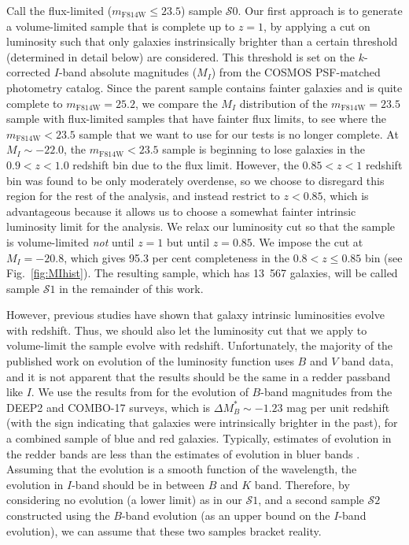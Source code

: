 \documentclass[twocolumn,useAMS,usenatbib]{mn2e}
\newcommand{\s}{\ensuremath{\mathcal{S}}}
\begin{document}
Call the flux-limited ($m_\text{F814W} \le 23.5$) sample \s$0$. Our first approach is to generate a volume-limited sample that is
complete up to $z=1$, by applying a cut on luminosity such that only
galaxies instrinsically brighter than a certain threshold (determined
in detail below) are considered. This threshold is set on the
$k$-corrected $I$-band absolute magnitudes ($M_I$) from the COSMOS PSF-matched
photometry catalog.   
Since the parent sample contains fainter galaxies and is quite
complete to $m_\text{F814W}=25.2$,
we compare the $M_I$ distribution
of the $m_\text{F814W}=23.5$ sample with flux-limited samples that
have fainter flux limits, to see where the $m_\text{F814W}<23.5$
sample that we want to use for our tests is no longer complete.
At $M_I\sim-22.0$, the
$m_\text{F814W}<23.5$ sample is beginning to lose galaxies in the
$0.9<z<1.0$ redshift bin due to the flux limit. However, the $0.85<z<1$
redshift bin was found to be only moderately overdense, so we choose
to disregard this region for the rest of the analysis, and instead
restrict to $z<0.85$, which is advantageous because it allows us to
choose a somewhat fainter intrinsic luminosity limit for the
analysis.  We relax our luminosity cut %
so that the sample is volume-limited \emph{not} until $z=1$ but until $z=0.85$. 
We impose the cut at $M_I=-20.8$, which gives 95.3 per cent completeness in
the $0.8 < z \le 0.85$ bin (see Fig.~\ref{fig:MIhist}). The resulting
sample, which has 13~567 galaxies, will be called sample \s$1$ in the remainder
of this work.

However, previous studies
\citep[e.g.,][]{2003A&A...401...73W,2005ApJ...622..116G,2006ApJ...647..853W,Faber2007}
have shown that galaxy intrinsic luminosities evolve with
redshift. Thus, we should also let the luminosity cut that we apply to
volume-limit the sample evolve with redshift. 
Unfortunately, the majority of the published work on evolution of the
luminosity function uses $B$ and $V$ band data, and it is not apparent
that the results should be the same in a redder passband like $I$.  
We use the results from \cite{Faber2007} for the evolution of
$B$-band magnitudes from the DEEP2 and COMBO-17 surveys, which is $
\Delta M_B^* \sim -1.23$ mag per unit redshift (with the sign
indicating that galaxies were intrinsically brighter in the past), for a combined sample
of blue and red galaxies. 
Typically, estimates of evolution in the redder bands are less than the estimates of evolution in bluer bands
\citep{1999ApJ...518..533L, 2003ApJ...592..819B}.
Assuming that the evolution is a smooth function of the wavelength,
the evolution in $I$-band should be in between $B$ and $K$ band. 
Therefore, by considering no evolution (a lower limit) as in our \s$1$, and a second
sample \s$2$ constructed using the $B$-band evolution (as an upper
bound on the $I$-band evolution), we can assume that these two samples
bracket reality.
\end{document}

